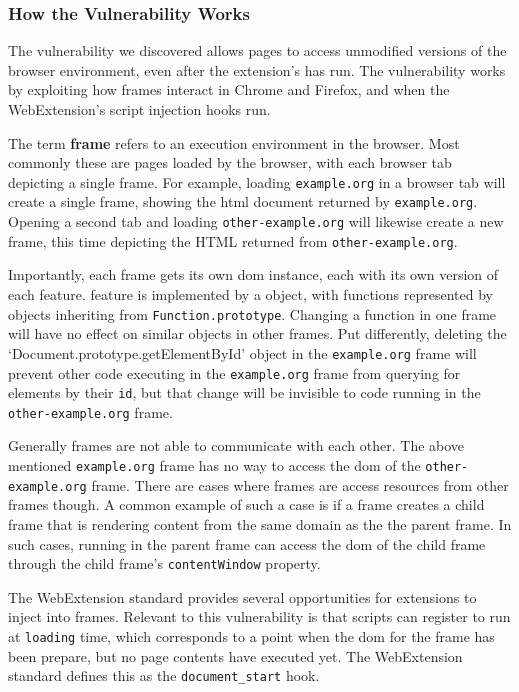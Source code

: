\subsubsection{How the Vulnerability Works}
The vulnerability we discovered allows pages to access unmodified versions
of the browser environment, even after the extension's \JS has run.  The
vulnerability works by exploiting how frames interact in Chrome and Firefox,
and when the WebExtension's script injection hooks run.


The term \textbf{frame} refers to an execution environment in the browser.
Most commonly these are pages loaded by the browser, with each browser
tab depicting a single frame.  For example, loading \texttt{example.org} in
a browser tab will create a single frame, showing the \gls{html} document
returned by \texttt{example.org}.  Opening a second tab and loading
\texttt{other-example.org} will likewise create a new frame, this time
depicting the HTML returned from \texttt{other-example.org}.

Importantly, each frame gets its own \gls{dom} instance, each with its own
version of each \WAPI feature.  \WAPI feature is implemented by a \JS object,
with functions represented by objects inheriting from
\texttt{Function.prototype}.  Changing a function in one frame will have no
effect on similar objects in other frames.  Put differently, deleting the
`Document.prototype.getElementById' object in the \texttt{example.org} frame
will prevent other code executing in the \texttt{example.org} frame from
querying for elements by their \texttt{id}, but that change will be invisible
to code running in the \texttt{other-example.org} frame.

Generally frames are not able to communicate with each other.  The above
mentioned \texttt{example.org} frame has no way to access the \gls{dom} of the
\texttt{other-example.org} frame.  There are cases where frames are access
resources from other frames though.  A common example of such a case is if
a frame creates a child frame that is rendering content from the same domain
as the the parent frame.  In such cases, \JS running in the parent frame
can access the \gls{dom} of the child frame through the child frame's
\texttt{contentWindow} property.

% 


The WebExtension standard provides several opportunities for extensions to
inject \JS into frames.  Relevant to this vulnerability is that scripts can
register to run at \texttt{loading} time, which corresponds to a point when
the \gls{dom} for the frame has been prepare, but no page contents have
executed yet. The WebExtension standard defines this as the
\texttt{document\_start} hook.

